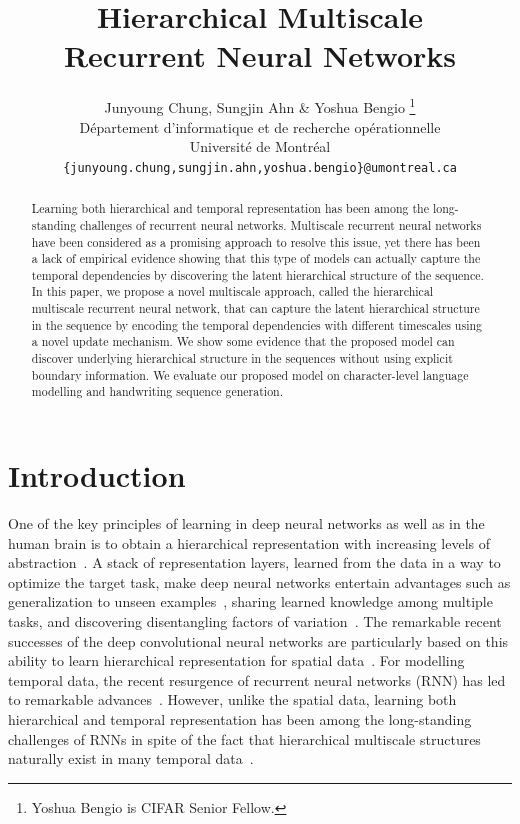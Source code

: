 \documentclass{article} %
\title{Hierarchical Multiscale \\ Recurrent Neural Networks}
\author{Junyoung Chung, Sungjin Ahn \& Yoshua Bengio
\thanks{Yoshua Bengio is CIFAR Senior Fellow.} \\
D\'epartement d'informatique et de recherche op\'erationnelle\\
Universit\'e de Montr\'eal\\
\texttt{\{junyoung.chung,sungjin.ahn,yoshua.bengio\}@umontreal.ca} \\
}
\begin{document}
\maketitle

\begin{abstract}
Learning both hierarchical and temporal representation has been among the long-standing challenges of recurrent neural networks.
Multiscale recurrent neural networks have been considered as a promising approach to resolve this issue, 
yet there has been a lack of empirical evidence showing that this type of models can actually capture the 
temporal dependencies by discovering the latent hierarchical structure of the sequence. 
In this paper, we propose a novel multiscale approach, called the hierarchical multiscale recurrent neural network,
that can capture the latent hierarchical structure in the sequence by encoding the temporal dependencies 
with different timescales using a novel update mechanism. 
We show some evidence that the proposed model can discover underlying hierarchical structure in the sequences
without using explicit boundary information. 
We evaluate our proposed model on character-level language modelling and handwriting sequence generation.
\end{abstract}

\section{Introduction}
\label{sec:introduction}
One of the key principles of learning in deep neural networks as well as in the human brain 
is to obtain a hierarchical representation with increasing levels of abstraction~\citep{bengio2009learning,lecun2015deep,schmidhuber2015deep}. 
A stack of representation layers, learned from the data in a way to optimize the target task, 
make deep neural networks entertain advantages such as generalization to unseen examples~\citep{hoffman2013one},
sharing learned knowledge among multiple tasks,
and discovering disentangling factors of variation~\citep{kingma2013auto}. 
The remarkable recent successes of the deep convolutional neural networks are particularly based on this ability to 
learn hierarchical representation for spatial data~\citep{krizhevsky2012imagenet}. 
For modelling temporal data, the recent resurgence of recurrent neural networks (RNN) has led to 
remarkable advances~\citep{mikolov2010recurrent,graves2013generating,Cho-et-al-EMNLP2014,sutskever2014sequence,vinyals2015show}. 
However, unlike the spatial data, learning both hierarchical and temporal representation has been among the long-standing challenges of RNNs 
in spite of the fact that hierarchical multiscale structures naturally exist in many 
temporal data~\citep{schmidhuber1991neural,mozer1993induction,el1995hierarchical,lin1996learning,koutnik2014clockwork}. 
\end{document}
